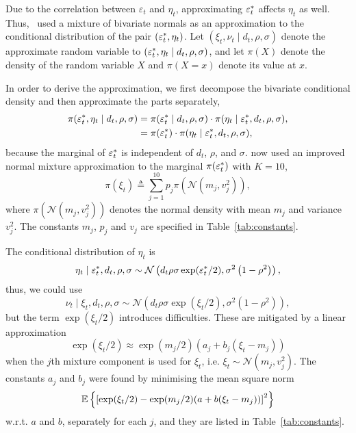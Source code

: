 Due to the correlation between $\varepsilon_t$ and $\eta_t$, approximating $\varepsilon_t^\ast$ affects $\eta_t$ as well.
Thus,~\citeauthor{Omori2007} used a mixture of bivariate normals as an approximation to the conditional distribution of the pair $(\varepsilon_t^\ast, \eta_t)$.
Let $(\xi_t,\nu_t\mid d_t,\rho,\sigma)$ denote the approximate random variable to $(\varepsilon_t^\ast,\eta_t\mid d_t,\rho,\sigma)$, and let $\pi(X)$ denote the density of the random variable $X$ and $\pi(X=x)$ denote its value at $x$.

In order to derive the approximation, we first decompose the bivariate conditional density and then approximate the parts separately,
\begin{align}
\pi(\varepsilon_t^\ast,\eta_t\mid d_t,\rho,\sigma) &= \pi(\varepsilon_t^\ast\mid d_t,\rho,\sigma)\cdot \pi(\eta_t\mid\varepsilon_t^\ast,d_t,\rho,\sigma),\nonumber \\
&= \pi(\varepsilon_t^\ast)\cdot \pi(\eta_t\mid\varepsilon_t^\ast,d_t,\rho,\sigma)\label{eq:decomp},
\end{align}
because the marginal of $\varepsilon_t^\ast$ is independent of $d_t$, $\rho$, and $\sigma$.
\citeauthor{Omori2007} now used an improved normal mixture approximation to the marginal $\pi(\varepsilon_t^\ast)$ with $K=10$,
\begin{equation}\label{eq:ets}
\pi(\xi_t)\triangleq\sum_{j=1}^{10}p_j\pi\left(\mathcal{N}\left(m_j,v_j^2\right)\right),
\end{equation}
where $\pi\left(\mathcal{N}\left(m_j,v_j^2\right)\right)$ denotes the normal density with mean $m_j$ and variance $v_j^2$.
The constants $m_j$, $p_j$ and $v_j$ are specified in Table~\ref{tab:constants}.

The conditional distribution of $\eta_t$ is
\begin{equation*}
\eta_t\mid\varepsilon_t^\ast,d_t,\rho,\sigma\sim\mathcal{N}\left(d_t\rho\sigma\exp(\varepsilon_t^\ast/2),\sigma^2\left(1-\rho^2\right)\right),
\end{equation*}
thus, we could use
\begin{equation}\label{eq:eta}
\nu_t\mid\xi_t,d_t,\rho,\sigma\sim\mathcal{N}\left(d_t\rho\sigma\exp(\xi_t/2),\sigma^2\left(1-\rho^2\right)\right),
\end{equation}
but the term $\exp(\xi_t/2)$ introduces difficulties.
These are mitigated by a linear approximation
\begin{equation}\label{eq:etslinear}
\exp(\xi_t/2)\approx\exp(m_j/2)(a_j+b_j(\xi_t-m_j))
\end{equation}
when the $j$th mixture component is used for $\xi_t$, i.e. $\xi_t\sim\mathcal{N}(m_j,v_j^2)$.
The constants $a_j$ and $b_j$ were found by minimising the mean square norm 
\begin{equation*}
\mathbb{E}\left\{\left[\exp(\xi_t/2)-\exp(m_j/2)(a+b(\xi_t-m_j))\right]^2\right\}
\end{equation*}
w.r.t. $a$ and $b$, separately for each $j$, and they are listed in Table~\ref{tab:constants}.

